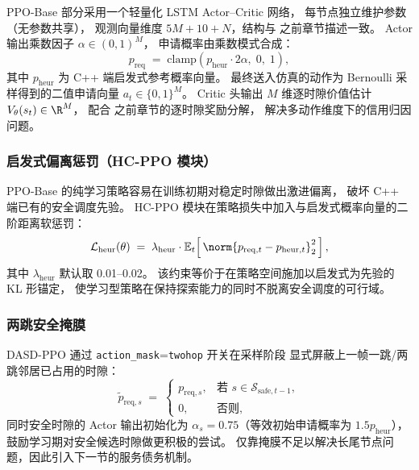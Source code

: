 PPO-Base 部分采用一个轻量化 LSTM Actor--Critic 网络，
每节点独立维护参数（无参数共享），
观测向量维度 $5M+10+N$，结构与  之前章节描述一致。
Actor 输出乘数因子 $\alpha \in (0,1)^M$，
申请概率由乘数模式合成：
\begin{equation}
p_{\mathrm{req}} \;=\; \mathrm{clamp}\!\left( p_{\mathrm{heur}} \cdot 2\alpha,\; 0,\; 1\right),
\label{eq:multiplier}
\end{equation}
其中 $p_{\mathrm{heur}}$ 为 C++ 端启发式参考概率向量。
最终送入仿真的动作为 Bernoulli 采样得到的二值申请向量
$a_t \in \{0,1\}^M$。
Critic 头输出 $M$ 维逐时隙价值估计 $V_\theta(s_t) \in \R^M$，
配合  之前章节的逐时隙奖励分解，
解决多动作维度下的信用归因问题。

\subsubsection{启发式偏离惩罚（HC-PPO 模块）}

PPO-Base 的纯学习策略容易在训练初期对稳定时隙做出激进偏离，
破坏 C++ 端已有的安全调度先验。
HC-PPO 模块在策略损失中加入与启发式概率向量的二阶距离软惩罚：
\begin{equation}
\mathcal{L}_{\mathrm{heur}}(\theta) \;=\; \lambda_{\mathrm{heur}} \cdot
   \mathbb{E}_{t}\!\left[\, \norm{p_{\mathrm{req},t} - p_{\mathrm{heur},t}}_2^2 \,\right],
\label{eq:heur-deviation}
\end{equation}
其中 $\lambda_{\mathrm{heur}}$ 默认取 0.01--0.02。
该约束等价于在策略空间施加以启发式为先验的 KL 形锚定，
使学习型策略在保持探索能力的同时不脱离安全调度的可行域。

\subsubsection{两跳安全掩膜}

DASD-PPO 通过 \texttt{action\_mask}=\texttt{twohop} 开关在采样阶段
显式屏蔽上一帧一跳/两跳邻居已占用的时隙：
\begin{equation}
\tilde{p}_{\mathrm{req},s} \;=\;
\begin{cases}
p_{\mathrm{req},s}, & \text{若 } s \in \mathcal{S}_{\mathrm{safe},t-1}, \\
0,                  & \text{否则},
\end{cases}
\label{eq:mask}
\end{equation}
同时安全时隙的 Actor 输出初始化为 $\alpha_s = 0.75$（等效初始申请概率为
$1.5 p_{\mathrm{heur}}$），鼓励学习期对安全候选时隙做更积极的尝试。
仅靠掩膜不足以解决长尾节点问题，因此引入下一节的服务债务机制。

